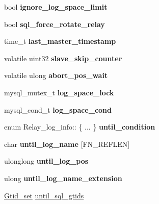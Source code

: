\begin{DoxyCompactItemize}
bool {\bfseries ignore\+\_\+log\+\_\+space\+\_\+limit}
\item 
\mbox{\label{classRelay__log__info_ada1d8a2d3efcbf5e271998cc79e0420d}} 
bool {\bfseries sql\+\_\+force\+\_\+rotate\+\_\+relay}
\item 
\mbox{\label{classRelay__log__info_ada985f35bb25a49503b6796ebdd7e12f}} 
time\+\_\+t {\bfseries last\+\_\+master\+\_\+timestamp}
\item 
\mbox{\label{classRelay__log__info_a0b9794ad546a88d09c36cc3da37ad167}} 
volatile uint32 {\bfseries slave\+\_\+skip\+\_\+counter}
\item 
\mbox{\label{classRelay__log__info_ac9508eb5e8371116f090e8dd8993e66a}} 
volatile ulong {\bfseries abort\+\_\+pos\+\_\+wait}
\item 
\mbox{\label{classRelay__log__info_a879ad96cea28534fcbe1c6e61b1a492e}} 
mysql\+\_\+mutex\+\_\+t {\bfseries log\+\_\+space\+\_\+lock}
\item 
\mbox{\label{classRelay__log__info_a1071e0704aa31e9550c22259931a76e7}} 
mysql\+\_\+cond\+\_\+t {\bfseries log\+\_\+space\+\_\+cond}
\item 
\mbox{\label{classRelay__log__info_aa4f1010aa58a0233b8b358f3620a3caa}} 
enum Relay\+\_\+log\+\_\+info\+:: \{ ... \}  {\bfseries until\+\_\+condition}
\item 
\mbox{\label{classRelay__log__info_a4b955793cd3354424ede9ae98c845769}} 
char {\bfseries until\+\_\+log\+\_\+name} \mbox{[}F\+N\+\_\+\+R\+E\+F\+L\+EN\mbox{]}
\item 
\mbox{\label{classRelay__log__info_a7089e457e060da138927f260de4e4e54}} 
ulonglong {\bfseries until\+\_\+log\+\_\+pos}
\item 
\mbox{\label{classRelay__log__info_af4b23b6ee506500e6c6c8f5fbfe7d76c}} 
ulong {\bfseries until\+\_\+log\+\_\+name\+\_\+extension}
\item 
\mbox{\hyperlink{classGtid__set}{Gtid\+\_\+set}} \mbox{\hyperlink{classRelay__log__info_a2f838f8d82a97c44226b63f35862616a}{until\+\_\+sql\+\_\+gtids}}

\end{DoxyCompactItemize}

